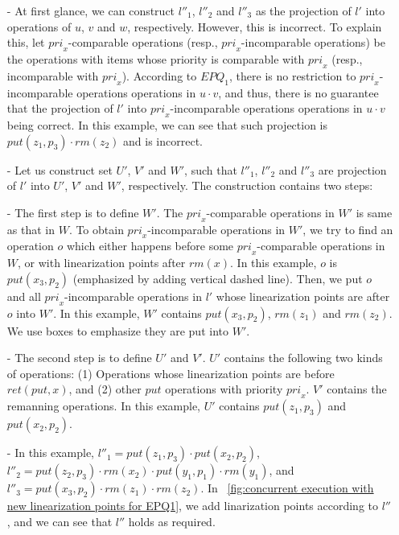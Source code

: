 \begin{itemize}
\setlength{\itemsep}{0.5pt}
\item[-] At first glance, we can construct $l''_1$, $l''_2$ and $l''_3$ as the projection of $l'$ into operations of $u$, $v$ and $w$, respectively. However, this is incorrect. To explain this, let $\textit{pri}_x$-comparable operations (resp., $\textit{pri}_x$-incomparable operations) be the operations with items whose priority is comparable with $\textit{pri}_x$ (resp., incomparable with $\textit{pri}_x$). According to $\textit{EPQ}_1$, there is no restriction to $\textit{pri}_x$-incomparable operations operations in $u \cdot v$, and thus, there is no guarantee that the projection of $l'$ into $\textit{pri}_x$-incomparable operations operations in $u \cdot v$ being correct. In this example, we can see that such projection is $\textit{put}(z_1,p_3) \cdot \textit{rm}(z_2)$ and is incorrect.

\item[-] Let us construct set $U'$, $V'$ and $W'$, such that $l''_1$, $l''_2$ and $l''_3$ are projection of $l'$ into $U'$, $V'$ and $W'$, respectively. The construction contains two steps:

\item[-] The first step is to define $W'$. The $\textit{pri}_x$-comparable operations in $W'$ is same as that in $W$. To obtain $\textit{pri}_x$-incomparable operations in $W'$, we try to find an operation $o$ which either happens before some $\textit{pri}_x$-comparable operations in $W$, or with linearization points after $\textit{rm}(x)$. In this example, $o$ is $\textit{put}(x_3,p_2)$ (emphasized by adding vertical dashed line). Then, we put $o$ and all $\textit{pri}_x$-incomparable operations in $l'$ whose linearization points are after $o$ into $W'$. In this example, $W'$ contains $\textit{put}(x_3,p_2)$, $\textit{rm}(z_1)$ and $\textit{rm}(z_2)$. We use boxes to emphasize they are put into $W'$.

\item[-] The second step is to define $U'$ and $V'$. $U'$ contains the following two kinds of operations: (1) Operations whose linearization points are before $\textit{ret}(\textit{put},x)$, and (2) other $\textit{put}$ operations with priority $\textit{pri}_x$. $V'$ contains the remanning operations. In this example, $U'$ contains $\textit{put}(z_1,p_3)$ and $\textit{put}(x_2,p_2)$.

\item[-] In this example, $l''_1 = \textit{put}(z_1,p_3) \cdot \textit{put}(x_2,p_2)$, $l''_2 = \textit{put}(z_2,p_3) \cdot \textit{rm}(x_2) \cdot \textit{put}(y_1,p_1) \cdot \textit{rm}(y_1)$, and $l''_3 = \textit{put}(x_3,p_2) \cdot \textit{rm}(z_1) \cdot \textit{rm}(z_2)$. In \figurename~\ref{fig:concurrent execution with new linearization points for EPQ1}, we add linarization points according to $l''$, and we can see that $l''$ holds as required.
\end{itemize}

